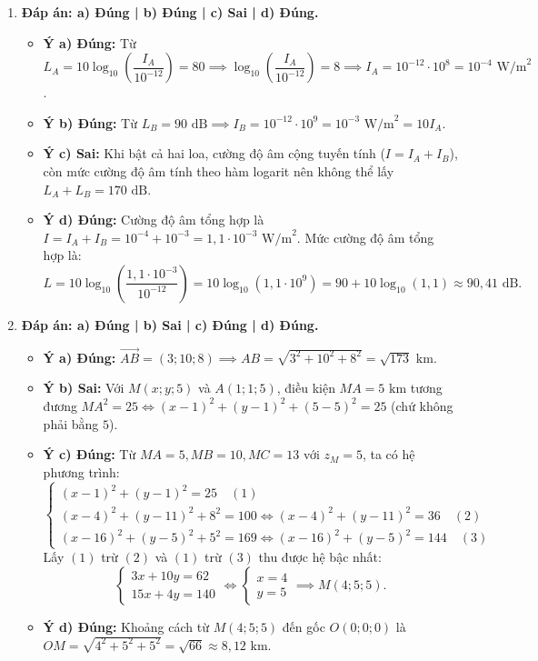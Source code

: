 \documentclass[12pt,a4paper]{article}
\begin{document}
\begin{enumerate}[label=\textbf{Câu \arabic*:}, leftmargin=*]
\item \textbf{Đáp án: a) Đúng | b) Đúng | c) Sai | d) Đúng.}
\begin{itemize}[leftmargin=*]
    \item \textbf{Ý a) Đúng:} Từ $L_A = 10\log_{10}\!\left(\dfrac{I_A}{10^{-12}}\right) = 80 \implies \log_{10}\!\left(\dfrac{I_A}{10^{-12}}\right) = 8 \implies I_A = 10^{-12} \cdot 10^8 = 10^{-4}\text{ W/m}^2$.
    \item \textbf{Ý b) Đúng:} Từ $L_B = 90\text{ dB} \implies I_B = 10^{-12} \cdot 10^9 = 10^{-3}\text{ W/m}^2 = 10 I_A$.
    \item \textbf{Ý c) Sai:} Khi bật cả hai loa, cường độ âm cộng tuyến tính ($I = I_A + I_B$), còn mức cường độ âm tính theo hàm logarit nên không thể lấy $L_A + L_B = 170\text{ dB}$.
    \item \textbf{Ý d) Đúng:} Cường độ âm tổng hợp là $I = I_A + I_B = 10^{-4} + 10^{-3} = 1{,}1 \cdot 10^{-3}\text{ W/m}^2$. Mức cường độ âm tổng hợp là:
    $$L = 10\log_{10}\!\left(\dfrac{1{,}1 \cdot 10^{-3}}{10^{-12}}\right) = 10\log_{10}(1{,}1 \cdot 10^9) = 90 + 10\log_{10}(1{,}1) \approx 90{,}41\text{ dB}.$$
\end{itemize}

\item \textbf{Đáp án: a) Đúng | b) Sai | c) Đúng | d) Đúng.}
\begin{itemize}[leftmargin=*]
    \item \textbf{Ý a) Đúng:} $\overrightarrow{AB} = (3; 10; 8) \implies AB = \sqrt{3^2 + 10^2 + 8^2} = \sqrt{173}\text{ km}$.
    \item \textbf{Ý b) Sai:} Với $M(x; y; 5)$ và $A(1; 1; 5)$, điều kiện $MA = 5\text{ km}$ tương đương $MA^2 = 25 \iff (x - 1)^2 + (y - 1)^2 + (5 - 5)^2 = 25$ (chứ không phải bằng $5$).
    \item \textbf{Ý c) Đúng:} Từ $MA = 5, MB = 10, MC = 13$ với $z_M = 5$, ta có hệ phương trình:
    $$\begin{cases} (x - 1)^2 + (y - 1)^2 = 25 \quad (1) \\ (x - 4)^2 + (y - 11)^2 + 8^2 = 100 \iff (x - 4)^2 + (y - 11)^2 = 36 \quad (2) \\ (x - 16)^2 + (y - 5)^2 + 5^2 = 169 \iff (x - 16)^2 + (y - 5)^2 = 144 \quad (3) \end{cases}$$
    Lấy $(1)$ trừ $(2)$ và $(1)$ trừ $(3)$ thu được hệ bậc nhất:
    $$\begin{cases} 3x + 10y = 62 \\ 15x + 4y = 140 \end{cases} \iff \begin{cases} x = 4 \\ y = 5 \end{cases} \implies M(4; 5; 5).$$
    \item \textbf{Ý d) Đúng:} Khoảng cách từ $M(4; 5; 5)$ đến gốc $O(0; 0; 0)$ là $OM = \sqrt{4^2 + 5^2 + 5^2} = \sqrt{66} \approx 8{,}12\text{ km}$.
\end{itemize}

\end{enumerate}
\end{document}

